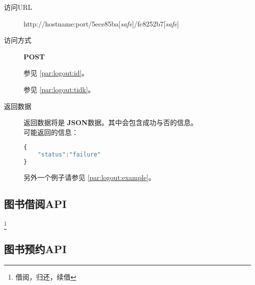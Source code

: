 \documentclass[UTF8]{article}
\def\safe{[\textit{safe}]}
\def\POST{\textbf{POST}}
\def\bfJSON{\textbf{JSON}}
\def\viaurl#1{\item[访问URL] #1}
\def\viareq#1{\item[访问方式] #1}
\def\rtdata{\item[返回数据]}
\begin{document}
        \begin{description}
            \viaurl http://hostname:port/5ece85ba\safe/fc8252b7\safe

            \viareq \POST

            参见 \ref{par:logout:id}。

            参见 \ref{par:logout:tidk}。


            \rtdata 返回数据将是 \bfJSON 数据。其中会包含成功与否的信息。
            \\可能返回的信息：
            \begin{lstlisting}[language=JavaScript]
{
    "status":"failure"
}
            \end{lstlisting}
            另外一个例子请参见 \ref{par:logout:example}。
        \end{description}


        \subsection{图书借阅API}
        \footnote{借阅，归还，续借}
        \subsection{图书预约API}
\end{document}
